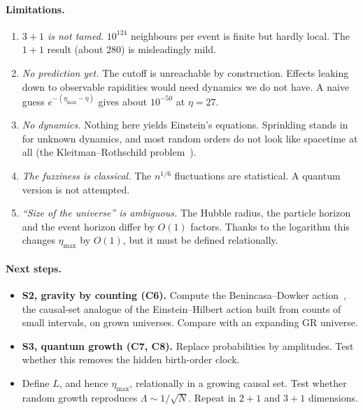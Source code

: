 \documentclass[11pt,a4paper]{article}
\begin{document}
\paragraph{Limitations.}
\begin{enumerate}[leftmargin=*,itemsep=1pt]
\item \emph{$3+1$ is not tamed.} $10^{124}$ neighbours per event is finite but hardly local. The $1+1$ result (about 280) is misleadingly mild.
\item \emph{No prediction yet.} The cutoff is unreachable by construction. Effects leaking down to observable rapidities would need dynamics we do not have. A naive guess $e^{-(\eta_{\max}-\eta)}$ gives about $10^{-50}$ at $\eta=27$.
\item \emph{No dynamics.} Nothing here yields Einstein's equations. Sprinkling stands in for unknown dynamics, and most random orders do not look like spacetime at all (the Kleitman--Rothschild problem~\cite{Surya19}).
\item \emph{The fuzziness is classical.} The $n^{1/6}$ fluctuations are statistical. A quantum version is not attempted.
\item \emph{``Size of the universe'' is ambiguous.} The Hubble radius, the particle horizon and the event horizon differ by $O(1)$ factors. Thanks to the logarithm this changes $\eta_{\max}$ by $O(1)$, but it must be defined relationally.
\end{enumerate}

\paragraph{Next steps.}
\begin{itemize}[leftmargin=*,itemsep=1pt]
\item \textbf{S2, gravity by counting (C6).} Compute the Benincasa--Dowker action~\cite{BD10}, the causal-set analogue of the Einstein--Hilbert action built from counts of small intervals, on grown universes. Compare with an expanding GR universe.
\item \textbf{S3, quantum growth (C7, C8).} Replace probabilities by amplitudes. Test whether this removes the hidden birth-order clock.
\item Define $L$, and hence $\eta_{\max}$, relationally in a growing causal set. Test whether random growth reproduces $\Lambda\sim1/\sqrt N$. Repeat in $2+1$ and $3+1$ dimensions.
\end{itemize}
\end{document}
